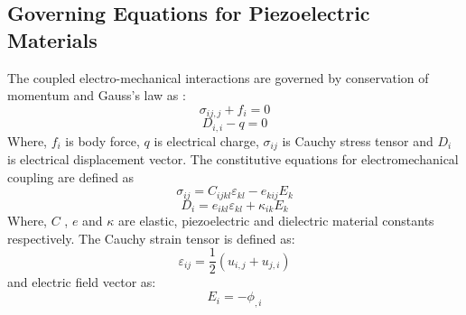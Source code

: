 \documentclass[11pt]{article}
\begin{document}
\subsection{Governing Equations for Piezoelectric Materials}
The coupled electro-mechanical interactions are governed by conservation of
momentum and Gauss's law as \cite{nguyen2018finite}:
\begin{equation} \label{MechEq}
\sigma_{ij,j} + f_i = 0
\end{equation} 
\begin{equation} \label{ElecEq}
D_{i,i} - q = 0
\end{equation}
Where, $ f_i $ is body force, $ q $ is electrical charge, $ \sigma_{ij} $ is
Cauchy stress tensor and $ D_i $ is electrical displacement vector.
The constitutive equations for electromechanical coupling are defined as
\begin{equation}
\sigma_{ij} = C_{ijkl} \varepsilon_{kl} - e_{kij} E_k
\end{equation}
\begin{equation}
D_i = e_{ikl} \varepsilon_{kl} + \kappa_{ik} E_k
\end{equation}
Where, $ C $ , $ e $ and $ \kappa $ are elastic,
piezoelectric and dielectric material constants respectively. The Cauchy strain
tensor is defined as:
\begin{equation}
\varepsilon_{ij} = \frac{1}{2} (u_{i,j} + u_{j,i})
\end{equation}
and electric field vector as:
\begin{equation}
E_i = -\phi_{,i}
\end{equation}
\end{document}
